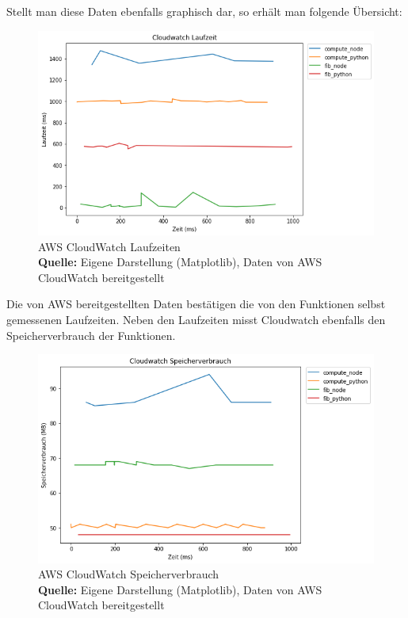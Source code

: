 \documentclass[12pt,a4paper,parskip=half]{scrreprt}
\newcommand*{\captionsource}[2]{%
	\caption[{#1}]{%
		#1%
		\\\hspace{\linewidth}%
		\textbf{Quelle:} #2%
	}%
}
\begin{document}
Stellt man diese Daten ebenfalls graphisch dar, so erhält man folgende Übersicht:

\FloatBarrier
\begin{figure}[h!]
	\centering
	\includegraphics[scale=0.7]{aw_c_cloudwatch}
	\captionsource{AWS CloudWatch Laufzeiten}
	{Eigene Darstellung (Matplotlib), Daten von AWS CloudWatch bereitgestellt}
	\label{aw_c_cloudwatch}
\end{figure}
\FloatBarrier

Die von AWS bereitgestellten Daten bestätigen die von den Funktionen selbst gemessenen Laufzeiten. Neben den Laufzeiten misst Cloudwatch ebenfalls den Speicherverbrauch der Funktionen.

\FloatBarrier
\begin{figure}[h!]
	\centering
	\includegraphics[scale=0.7]{aw_c_cloudwatch_ram}
	\captionsource{AWS CloudWatch Speicherverbrauch}
	{Eigene Darstellung (Matplotlib), Daten von AWS CloudWatch bereitgestellt}
	\label{aw_c_cloudwatch_ram}
\end{figure}
\FloatBarrier
\end{document}
